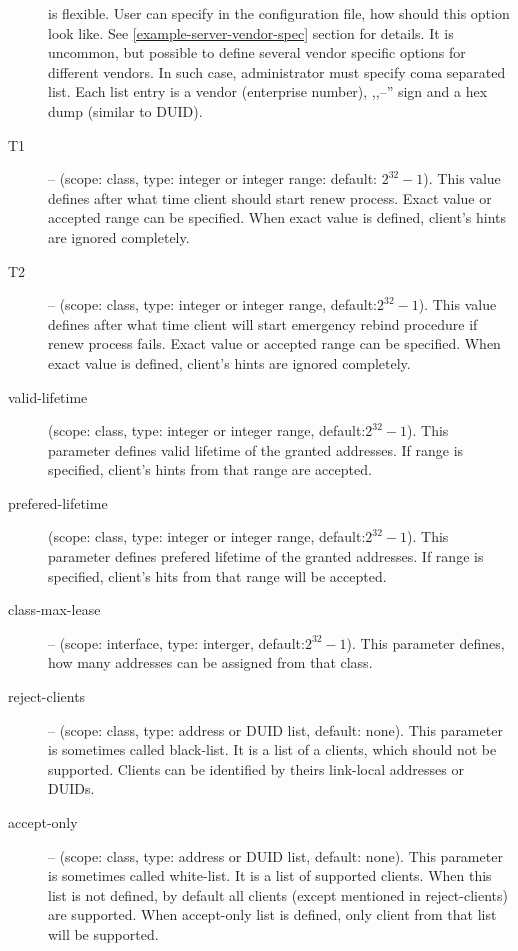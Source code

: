 \begin{description}
	    is flexible. User can specify in the configuration file,
	    how should this option look like. See
	    \ref{example-server-vendor-spec} section for details. It
            is uncommon, but possible to define several vendor
            specific options for different vendors. In such case,
            administrator must specify coma separated list. Each list
            entry is a vendor (enterprise number), ,,--'' sign and a
            hex dump (similar to DUID).
 \item[T1] -- (scope: class, type: integer or integer range: default:
            $2^{32}-1$). This value
	    defines after what time client should start renew
	    process. Exact value or accepted range can be
            specified. When exact value is defined, client's hints are
            ignored completely. 
 \item[T2] -- (scope: class, type: integer or integer range, default:$2^{32}-1$). This value
	    defines after what time client will start emergency rebind
	    procedure if renew process fails. Exact value or accepted range can be
            specified. When exact value is defined, client's hints are
            ignored completely.
\item[valid-lifetime] (scope: class, type: integer or integer range,
	    default:$2^{32}-1$). This parameter defines valid lifetime of
	    the granted addresses. If range is specified, client's
            hints from that range are accepted.
\item[prefered-lifetime] (scope: class, type: integer or integer range,
	    default:$2^{32}-1$). This parameter defines prefered
            lifetime of the granted addresses. If range is specified,
            client's hits from that range will be accepted.
\item[class-max-lease]  -- (scope: interface, type: interger,
            default:$2^{32}-1$). This parameter defines, how many
            addresses can be assigned from that class.
\item[reject-clients] -- (scope: class, type: address or DUID list,
            default: none). This parameter is sometimes called
            black-list. It is a list of a clients, which should not be
            supported. Clients can be identified by theirs link-local
            addresses or DUIDs.
\item[accept-only] -- (scope: class, type: address or DUID list,
            default: none). This parameter is sometimes called
            white-list. It is a list of supported clients. When this
            list is not defined, by default all clients (except
            mentioned in reject-clients) are supported. When
            accept-only list is defined, only client from that list
            will be supported.
\end{description}

